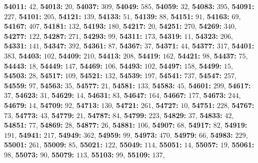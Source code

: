 \textsf{\bfseries 54011:} $42$, \textsf{\bfseries 54013:} $20$, \textsf{\bfseries 54037:} $309$, \textsf{\bfseries 54049:} $585$, \textsf{\bfseries 54059:} $32$, \textsf{\bfseries 54083:} $395$, \textsf{\bfseries 54091:} $227$, \textsf{\bfseries 54101:} $205$, \textsf{\bfseries 54121:} $139$, \textsf{\bfseries 54133:} $51$, \textsf{\bfseries 54139:} $88$, \textsf{\bfseries 54151:} $91$, \textsf{\bfseries 54163:} $69$, \textsf{\bfseries 54167:} $407$, \textsf{\bfseries 54181:} $132$, \textsf{\bfseries 54193:} $180$, \textsf{\bfseries 54217:} $20$, \textsf{\bfseries 54251:} $270$, \textsf{\bfseries 54269:} $340$, \textsf{\bfseries 54277:} $122$, \textsf{\bfseries 54287:} $271$, \textsf{\bfseries 54293:} $99$, \textsf{\bfseries 54311:} $173$, \textsf{\bfseries 54319:} $11$, \textsf{\bfseries 54323:} $206$, \textsf{\bfseries 54331:} $141$, \textsf{\bfseries 54347:} $392$, \textsf{\bfseries 54361:} $87$, \textsf{\bfseries 54367:} $37$, \textsf{\bfseries 54371:} $44$, \textsf{\bfseries 54377:} $317$, \textsf{\bfseries 54401:} $383$, \textsf{\bfseries 54403:} $102$, \textsf{\bfseries 54409:} $210$, \textsf{\bfseries 54413:} $208$, \textsf{\bfseries 54419:} $162$, \textsf{\bfseries 54421:} $98$, \textsf{\bfseries 54437:} $75$, \textsf{\bfseries 54443:} $18$, \textsf{\bfseries 54449:} $147$, \textsf{\bfseries 54469:} $106$, \textsf{\bfseries 54493:} $102$, \textsf{\bfseries 54497:} $158$, \textsf{\bfseries 54499:} $15$, \textsf{\bfseries 54503:} $28$, \textsf{\bfseries 54517:} $109$, \textsf{\bfseries 54521:} $132$, \textsf{\bfseries 54539:} $197$, \textsf{\bfseries 54541:} $737$, \textsf{\bfseries 54547:} $257$, \textsf{\bfseries 54559:} $97$, \textsf{\bfseries 54563:} $35$, \textsf{\bfseries 54577:} $21$, \textsf{\bfseries 54581:} $133$, \textsf{\bfseries 54583:} $45$, \textsf{\bfseries 54601:} $299$, \textsf{\bfseries 54617:} $37$, \textsf{\bfseries 54623:} $31$, \textsf{\bfseries 54629:} $14$, \textsf{\bfseries 54631:} $83$, \textsf{\bfseries 54647:} $164$, \textsf{\bfseries 54667:} $177$, \textsf{\bfseries 54673:} $244$, \textsf{\bfseries 54679:} $14$, \textsf{\bfseries 54709:} $92$, \textsf{\bfseries 54713:} $130$, \textsf{\bfseries 54721:} $261$, \textsf{\bfseries 54727:} $10$, \textsf{\bfseries 54751:} $228$, \textsf{\bfseries 54767:} $73$, \textsf{\bfseries 54773:} $43$, \textsf{\bfseries 54779:} $21$, \textsf{\bfseries 54787:} $84$, \textsf{\bfseries 54799:} $223$, \textsf{\bfseries 54829:} $37$, \textsf{\bfseries 54833:} $42$, \textsf{\bfseries 54851:} $77$, \textsf{\bfseries 54869:} $28$, \textsf{\bfseries 54877:} $26$, \textsf{\bfseries 54881:} $106$, \textsf{\bfseries 54907:} $68$, \textsf{\bfseries 54917:} $82$, \textsf{\bfseries 54919:} $191$, \textsf{\bfseries 54941:} $217$, \textsf{\bfseries 54949:} $362$, \textsf{\bfseries 54959:} $99$, \textsf{\bfseries 54973:} $470$, \textsf{\bfseries 54979:} $66$, \textsf{\bfseries 54983:} $229$, \textsf{\bfseries 55001:} $261$, \textsf{\bfseries 55009:} $85$, \textsf{\bfseries 55021:} $122$, \textsf{\bfseries 55049:} $114$, \textsf{\bfseries 55051:} $14$, \textsf{\bfseries 55057:} $19$, \textsf{\bfseries 55061:} $98$, \textsf{\bfseries 55073:} $90$, \textsf{\bfseries 55079:} $113$, \textsf{\bfseries 55103:} $99$, \textsf{\bfseries 55109:} $137$, 
